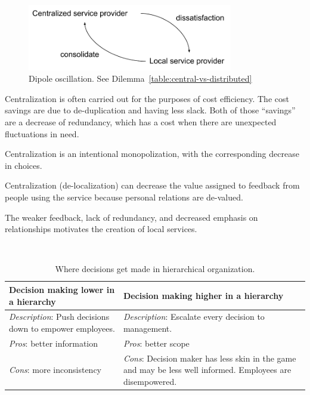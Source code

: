 \begin{figure}[ht]
    \centering
    \includegraphics[width=0.8\textwidth]{images/dilemma_centralization-vs-distributed.pdf}
    \caption{Dipole oscillation. See Dilemma~\ref{table:central-vs-distributed}}
    \label{fig:central-vs-distributed}
\end{figure}

Centralization is often carried out for the purposes of cost efficiency. The cost savings are due to de-duplication and having less slack. Both of those ``savings'' are a decrease of redundancy, which has a cost when there are unexpected fluctuations in need. 

Centralization is an intentional monopolization, with the corresponding decrease in choices. 

Centralization (de-localization) can decrease the value assigned to feedback from people using the service because personal relations are de-valued. 

The weaker feedback, lack of redundancy, and decreased emphasis on relationships motivates the creation of local services. 

\ \\

\begin{center}
\begin{table}[ht]
\begin{tabular}{ | m{\dilemmatablewidth}| m{\dilemmatablewidth} | } 
  \hline
  \textbf{Decision making lower in a hierarchy} &
  \textbf{Decision making higher in a hierarchy} \\
  \hline
  \textit{Description}: Push decisions down to empower employees. &
  \textit{Description}: Escalate every decision to management. \\  
  \hline
  \textit{Pros}: better information &
  \textit{Pros}: better scope \\
  \hline
  \textit{Cons}: more inconsistency & 
  \textit{Cons}: Decision maker has less skin in the game and may be less well informed. Employees are disempowered. \\
  \hline
\end{tabular}
\caption{Where decisions get made in hierarchical organization.
}
\label{table:decisions_low-vs-high}
\end{table}
\end{center}

